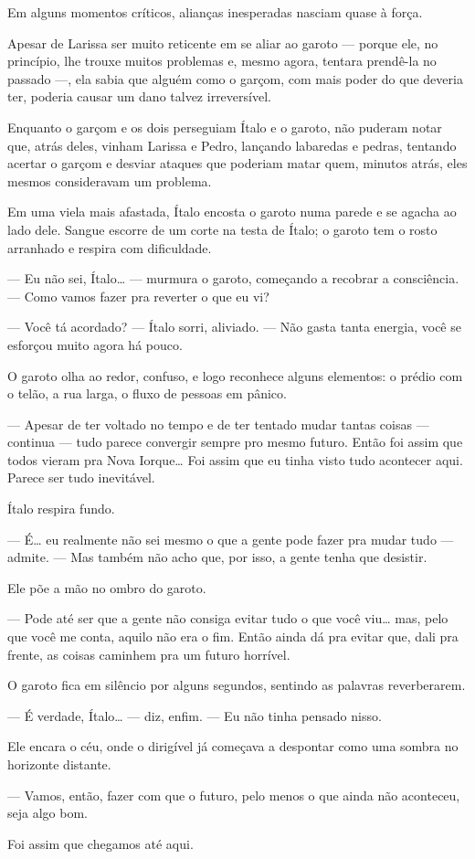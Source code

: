 Em alguns momentos críticos, alianças inesperadas nasciam quase à força.

Apesar de Larissa ser muito reticente em se aliar ao garoto — porque ele, no princípio, lhe trouxe muitos problemas e, mesmo agora, tentara prendê-la no passado —, ela sabia que alguém como o garçom, com mais poder do que deveria ter, poderia causar um dano talvez irreversível.

Enquanto o garçom e os dois perseguiam Ítalo e o garoto, não puderam notar que, atrás deles, vinham Larissa e Pedro, lançando labaredas e pedras, tentando acertar o garçom e desviar ataques que poderiam matar quem, minutos atrás, eles mesmos consideravam um problema.

\bigskip

Em uma viela mais afastada, Ítalo encosta o garoto numa parede e se agacha ao lado dele.  
Sangue escorre de um corte na testa de Ítalo; o garoto tem o rosto arranhado e respira com dificuldade.

— Eu não sei, Ítalo… — murmura o garoto, começando a recobrar a consciência. — Como vamos fazer pra reverter o que eu vi?

— Você tá acordado? — Ítalo sorri, aliviado. — Não gasta tanta energia, você se esforçou muito agora há pouco.

O garoto olha ao redor, confuso, e logo reconhece alguns elementos: o prédio com o telão, a rua larga, o fluxo de pessoas em pânico.

— Apesar de ter voltado no tempo e de ter tentado mudar tantas coisas — continua — tudo parece convergir sempre pro mesmo futuro.  
Então foi assim que todos vieram pra Nova Iorque…  
Foi assim que eu tinha visto tudo acontecer aqui.  
Parece ser tudo inevitável.

Ítalo respira fundo.

— É… eu realmente não sei mesmo o que a gente pode fazer pra mudar tudo — admite. — Mas também não acho que, por isso, a gente tenha que desistir.

Ele põe a mão no ombro do garoto.

— Pode até ser que a gente não consiga evitar tudo o que você viu… mas, pelo que você me conta, aquilo não era o fim.  
Então ainda dá pra evitar que, dali pra frente, as coisas caminhem pra um futuro horrível.

O garoto fica em silêncio por alguns segundos, sentindo as palavras reverberarem.

— É verdade, Ítalo… — diz, enfim. — Eu não tinha pensado nisso.

Ele encara o céu, onde o dirigível já começava a despontar como uma sombra no horizonte distante.

— Vamos, então, fazer com que o futuro, pelo menos o que ainda não aconteceu, seja algo bom.

Foi assim que chegamos até aqui.
